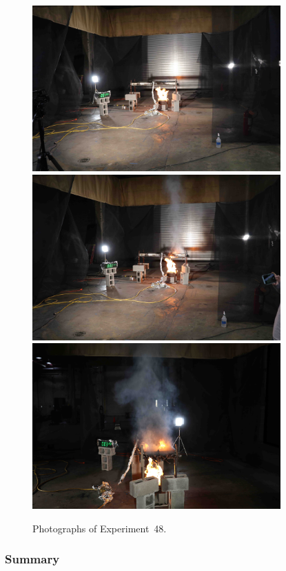 \begin{figure}[p]
\centering
\includegraphics[height=2.50in]{../FIGURES/Test_48_1_min_3_s} \\
\includegraphics[height=2.50in]{../FIGURES/Test_48_3_min_11_s} \\
\includegraphics[height=2.50in]{../FIGURES/Test_48_3_min_28_s}
\caption[Photographs of Experiment~48]{Photographs of Experiment~48.}
\label{fig:Test_48_photos}
\end{figure}


\clearpage

\subsubsection{Summary}

